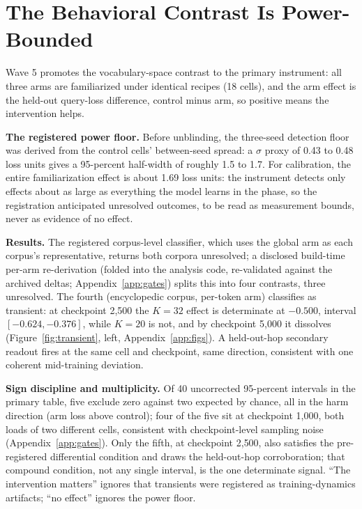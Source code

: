 \section{The Behavioral Contrast Is Power-Bounded}
\label{sec:behavioral}

Wave 5 promotes the vocabulary-space contrast to the primary instrument:
all three arms are familiarized under identical recipes (18 cells), and
the arm effect is the held-out query-loss difference, control minus arm,
so positive means the intervention helps.

\textbf{The registered power floor.} Before unblinding, the three-seed
detection floor was derived from the control cells' between-seed spread: a
$\sigma$ proxy of 0.43 to 0.48 loss units gives a 95-percent half-width of
roughly 1.5 to 1.7. %
For calibration, the entire familiarization effect is about 1.69 loss
units: %
the instrument detects only effects about as large as everything the model
learns in the phase, so the registration anticipated unresolved outcomes,
to be read as measurement bounds, never as evidence of no effect.

\textbf{Results.} The registered corpus-level classifier, which uses the
global arm as each corpus's representative, returns both corpora
unresolved; a disclosed build-time per-arm re-derivation (folded into the
analysis code, re-validated against the archived deltas;
Appendix~\ref{app:gates}) splits this into four contrasts, three
unresolved. %
The fourth (encyclopedic corpus, per-token arm) classifies as transient:
at checkpoint 2{,}500 the $K{=}32$ effect is determinate at $-0.500$,
interval $[-0.624, -0.376]$, while $K{=}20$ is not, and by checkpoint
5{,}000 it dissolves
(Figure~\ref{fig:transient}, left, Appendix~\ref{app:figs}). A
held-out-hop secondary readout fires at the same cell and checkpoint, same
direction, %
consistent with one coherent mid-training deviation.

\textbf{Sign discipline and multiplicity.} Of 40 uncorrected 95-percent
intervals in the primary table, five exclude zero against two expected by
chance, all in the harm direction (arm loss above control); four of the
five sit at checkpoint 1{,}000, both loads of two different cells,
consistent with checkpoint-level sampling noise (Appendix~\ref{app:gates}).
Only the fifth, at checkpoint 2{,}500, also satisfies the pre-registered
differential condition and draws the held-out-hop corroboration; that
compound condition, not any single interval, is the one determinate signal.
``The intervention matters'' ignores that transients were registered as
training-dynamics artifacts; ``no effect'' ignores the power floor.
